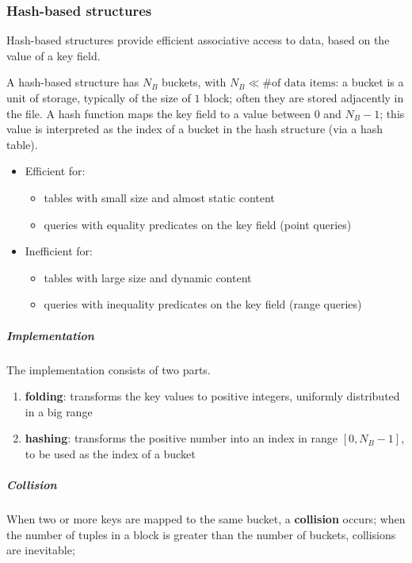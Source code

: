 \documentclass[english]{article}
\begin{document}
\subsubsection{Hash-based structures}

Hash-based structures provide efficient associative access to data, based on the value of a key field.

A hash-based structure has \(N_B\) buckets, with \(N_B \ll \# \text{of data items}\):
a bucket is a unit of storage, typically of the size of \(1\) block;
often they are stored adjacently in the file.
A hash function maps the key field to a value between \(0\) and \(N_B -1\);
this value is interpreted as the index of a bucket in the hash structure (via a hash table).

\begin{itemize}
  \item Efficient for:
        \begin{itemize}[label=\cmarkthin]
          \item tables with small size and almost static content
          \item queries with equality predicates on the key field (point queries)
        \end{itemize}
  \item Inefficient for:
        \begin{itemize}[label=\xmarkthin]
          \item tables with large size and dynamic content
          \item queries with inequality predicates on the key field (range queries)
        \end{itemize}
\end{itemize}

\subparagraph*{Implementation}
The implementation consists of two parts.

\begin{enumerate}
  \item \textbf{folding}: transforms the key values to positive integers, uniformly distributed in a big range
  \item \textbf{hashing}: transforms the positive number into an index in range \(\left[ 0, N_B - 1 \right]\), to be used as the index of a bucket
\end{enumerate}

\subparagraph*{Collision}
When two or more keys are mapped to the same bucket, a \textbf{collision} occurs;
when the number of tuples in a block is greater than the number of buckets, collisions are inevitable;
\end{document}
